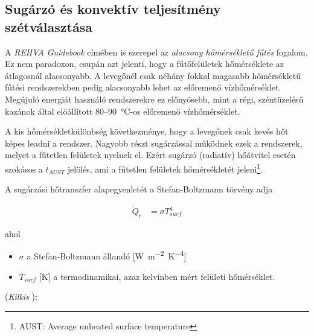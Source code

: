 

\subsection{Sugárzó és konvektív teljesítmény szétválasztása}

A \textit{REHVA Guidebook} \cite{RehvaGuidebookNo7} címében is szerepel az \textit{alacsony hőmérsékletű fűtés} fogalom. Ez nem paradoxon, csupán azt jelenti, hogy a fűtőfelületek hőmérséklete az átlagosnál alacsonyabb. A levegőnél csak néhány fokkal magasabb hőmérsékletű fűtési rendszerekben pedig alacsonyabb lehet az előremenő vízhőmérséklet. Megújuló energiát használó rendszerekre ez előnyösebb, mint a régi, széntüzelésű kazánok által előállított 80--\SI{90}{\celsius}-os előremenő vízhőmérséklet.

A kis hőmérsékletkülönbség következménye, hogy a levegőnek csak kevés hőt képes leadni a rendszer. Nagyobb részt sugárzással működnek ezek a rendszerek, melyet a fűtetlen felületek nyelnek el. Ezért sugárzó (radiatív) hőátvitel esetén szokásos a $t_{AUST}$ jelölés, ami a fűtetlen felületek hőmérsékletét jeleni\footnote{AUST: Average unheated surface temperature}.

A sugárzási hőtranszfer alapegyenletét a Stefan-Boltzmann törvény adja


\begin{equation} \label{eq_stefan_boltzmann}
\begin{aligned}
\dot Q_{r} &= \sigma T_{surf}^4
\end{aligned}
\end{equation}

ahol
\begin{itemize}[itemsep=9pt,topsep=0pt,parsep=0pt,partopsep=0pt]
	\item[] $\sigma$ a Stefan-Boltzmann állandó [\si{W~m^{-2}.K^{-4}}] %
	\item[] $T_{surf}$ [\si{\kelvin}] a termodinamikai, azaz kelvinben mért felületi hőmérséklet.
\end{itemize}


(\textit{Kilkis} \cite{KILKIS1994} ):

